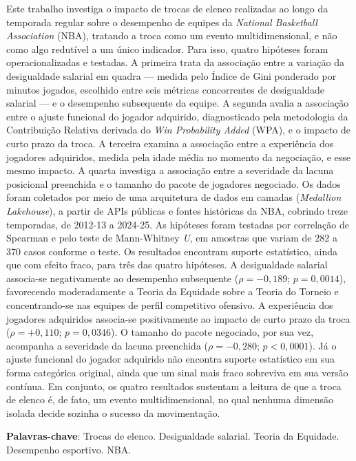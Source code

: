 \noindent Este trabalho investiga o impacto de trocas de elenco realizadas ao longo da temporada regular sobre o desempenho de equipes da \textit{National Basketball Association} (NBA), tratando a troca como um evento multidimensional, e não como algo redutível a um único indicador. Para isso, quatro hipóteses foram operacionalizadas e testadas. A primeira trata da associação entre a variação da desigualdade salarial em quadra — medida pelo Índice de Gini ponderado por minutos jogados, escolhido entre seis métricas concorrentes de desigualdade salarial — e o desempenho subsequente da equipe. A segunda avalia a associação entre o ajuste funcional do jogador adquirido, diagnosticado pela metodologia da Contribuição Relativa derivada do \textit{Win Probability Added} (WPA), e o impacto de curto prazo da troca. A terceira examina a associação entre a experiência dos jogadores adquiridos, medida pela idade média no momento da negociação, e esse mesmo impacto. A quarta investiga a associação entre a severidade da lacuna posicional preenchida e o tamanho do pacote de jogadores negociado. Os dados foram coletados por meio de uma arquitetura de dados em camadas (\textit{Medallion Lakehouse}), a partir de APIs públicas e fontes históricas da NBA, cobrindo treze temporadas, de 2012-13 a 2024-25. As hipóteses foram testadas por correlação de Spearman e pelo teste de Mann-Whitney \textit{U}, em amostras que variam de 282 a 370 casos conforme o teste. Os resultados encontram suporte estatístico, ainda que com efeito fraco, para três das quatro hipóteses. A desigualdade salarial associa-se negativamente ao desempenho subsequente ($\rho = -0{,}189$; $p = 0{,}0014$), favorecendo moderadamente a Teoria da Equidade sobre a Teoria do Torneio e concentrando-se nas equipes de perfil competitivo ofensivo. A experiência dos jogadores adquiridos associa-se positivamente ao impacto de curto prazo da troca ($\rho = +0{,}110$; $p = 0{,}0346$). O tamanho do pacote negociado, por sua vez, acompanha a severidade da lacuna preenchida ($\rho = -0{,}280$; $p < 0{,}0001$). Já o ajuste funcional do jogador adquirido não encontra suporte estatístico em sua forma categórica original, ainda que um sinal mais fraco sobreviva em sua versão contínua. Em conjunto, os quatro resultados sustentam a leitura de que a troca de elenco é, de fato, um evento multidimensional, no qual nenhuma dimensão isolada decide sozinha o sucesso da movimentação.

\vspace{0.5cm}
\noindent\textbf{Palavras-chave}: Trocas de elenco. Desigualdade salarial. Teoria da Equidade. Desempenho esportivo. NBA.

